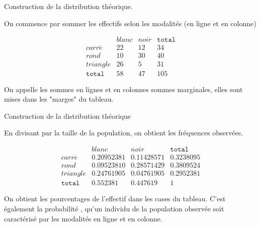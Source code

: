 \documentclass{beamer}
\begin{document}
\begin{frame}{ Construction de la distribution théorique.}

On commence par sommer les effectifs selon les modalités (en ligne et en colonne)

$$\begin{array}{c|c|c|c}
   & blanc & noir & \texttt{total}\\ 
   \hline
carr\acute{e} &  22 &   12 & 34\\ 
  \hline
  rond &   10 &  30 &  40  \\ 
    \hline
  triangle &  26 &   5 &  31\\
  \hline
  \texttt{total} & 58 & 47 & 105
  \end{array}$$

On appelle les sommes en lignes et en colonnes \alert{sommes marginales}, elles sont mises dans les "marges" du tableau.

\end{frame}


\begin{frame}{ Construction de la distribution théorique}

En divisant par la taille de la population, on obtient les \alert{fréquences observées}.

$$\begin{array}{c|c|c|c}
   & blanc & noir & \texttt{total}\\ 
   \hline
carr\acute{e} &  0.20952381&  0.11428571 &  0.3238095\\ 
  \hline
  rond &    0.09523810 & 0.28571429 & 0.3809524  \\ 
    \hline
  triangle & 0.24761905 & 0.04761905 &   0.2952381\\
  \hline
  \texttt{total} &  0.552381 & 0.447619 & 1
  \end{array}$$



\vspace{0.5cm}

\begin{small}
On obtient les \alert{pourcentages de l'effectif} dans les cases du tableau.
C'est également la \alert{probabilité} , qu'un individu de la population \alert{observée} soit caractérisé par les modalités en ligne et en colonne.
\end{small}
\end{frame}
\end{document}
